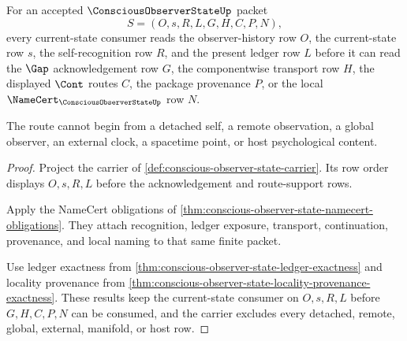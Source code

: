 \begin{theorem}
\label{thm:conscious-observer-state-current-ledger-route}
For an accepted $\ConsciousObserverStateUp$ packet
$$
S=(O,s,R,L,G,H,C,P,N),
$$
every current-state consumer reads the observer-history row $O$, the current-state row $s$, the self-recognition row $R$, and the present ledger row $L$ before it can read the $\Gap$ acknowledgement row $G$, the componentwise transport row $H$, the displayed $\Cont$ routes $C$, the package provenance $P$, or the local $\NameCert_{\ConsciousObserverStateUp}$ row $N$.

The route cannot begin from a detached self, a remote observation, a global observer, an external clock, a spacetime point, or host psychological content.
\end{theorem}
\begin{proof}
Project the carrier of \autoref{def:conscious-observer-state-carrier}. Its row order displays $O,s,R,L$ before the acknowledgement and route-support rows.

Apply the NameCert obligations of \autoref{thm:conscious-observer-state-namecert-obligations}. They attach recognition, ledger exposure, transport, continuation, provenance, and local naming to that same finite packet.

Use ledger exactness from \autoref{thm:conscious-observer-state-ledger-exactness} and locality provenance from \autoref{thm:conscious-observer-state-locality-provenance-exactness}. These results keep the current-state consumer on $O,s,R,L$ before $G,H,C,P,N$ can be consumed, and the carrier excludes every detached, remote, global, external, manifold, or host row.
\end{proof}

